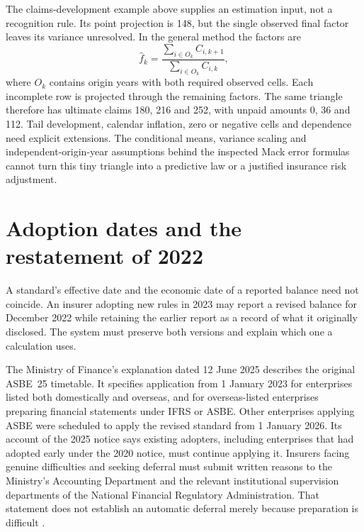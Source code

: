 The claims-development example above supplies an estimation input, not a
recognition rule. Its point projection is 148, but the single observed final
factor leaves its variance unresolved. In the general method the factors are
\[
 \widehat f_k=\frac{\sum_{i\in O_k} C_{i,k+1}}{\sum_{i\in O_k}C_{i,k}},
\]
where $O_k$ contains origin years with both required observed cells. Each
incomplete row is projected through the remaining factors. The same triangle
therefore has ultimate claims 180, 216 and 252, with unpaid amounts 0, 36 and
112. Tail development, calendar inflation, zero or negative cells and dependence
need explicit extensions. The conditional means, variance scaling and
independent-origin-year assumptions behind the inspected Mack error formulas
\citep[equations (1)--(3), Theorems 1--3]{mack1993} cannot turn this tiny
triangle into a predictive law or a justified insurance risk adjustment.

\section{Adoption dates and the restatement of 2022}
\label{sec:insurance-adoption}

A standard's effective date and the economic date of a reported balance need
not coincide. An insurer adopting new rules in 2023 may report a revised
balance for December 2022 while retaining the earlier report as a record of
what it originally disclosed. The system must preserve both versions and
explain which one a calculation uses.

The Ministry of Finance's explanation dated 12 June 2025 describes the original
ASBE~25 timetable. It specifies application from 1 January 2023 for enterprises
listed both domestically and overseas, and for overseas-listed enterprises
preparing financial statements under IFRS or ASBE. Other enterprises applying
ASBE were scheduled to apply the revised standard from 1 January 2026.
Its account of the
2025 notice says existing adopters, including enterprises that had adopted
early under the 2020 notice, must continue applying it. Insurers facing genuine
difficulties and seeking deferral must submit written reasons to the Ministry's
Accounting Department and the relevant institutional supervision departments
of the National Financial Regulatory Administration. That statement does not
establish an automatic deferral merely because preparation is difficult
\citep[answers on background and implementation arrangements]{mofinsurance2025qa}.

